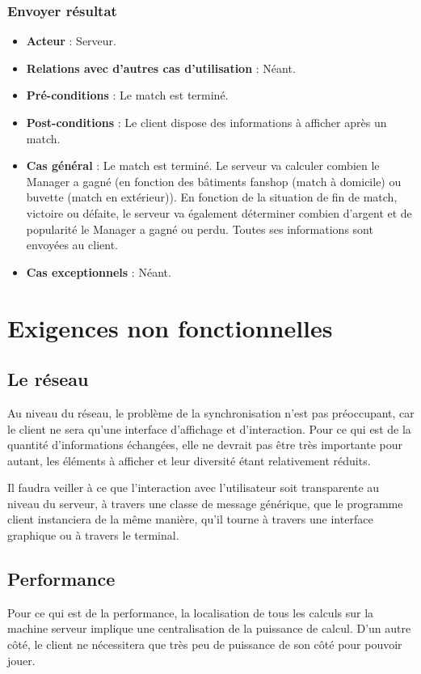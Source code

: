 \documentclass[a4paper,titlepage]{scrreprt}
\begin{document}
    \subsubsection{Envoyer résultat}
      \begin{itemize}
        \item \textbf{Acteur}  : Serveur.
        \item \textbf{Relations avec d'autres cas d'utilisation}  : Néant.
        \item \textbf{Pré-conditions} : Le match est terminé.
        \item \textbf{Post-conditions} : Le client dispose des informations à afficher après un match.
        \item \textbf{Cas général} : Le match est terminé. Le serveur va calculer combien le Manager a gagné (en fonction des bâtiments \gls{fanshop} (match à domicile) ou \gls{buvette} (match en extérieur)). En fonction de la situation de fin de match, victoire ou défaite, le serveur va également déterminer combien d’argent et de popularité le Manager a gagné ou perdu. Toutes ses informations sont envoyées au client.
        \item \textbf{Cas exceptionnels} : Néant.
      \end{itemize}




\section{Exigences non fonctionnelles}
  \subsection{Le réseau}
  Au niveau du réseau, le problème de la synchronisation n'est pas préoccupant, 
  car le client ne sera qu'une interface d'affichage et d'interaction. 
  Pour ce qui est de la quantité d'informations échangées, 
  elle ne devrait pas être très importante pour autant, 
  les éléments à afficher et leur diversité étant relativement réduits.
  
  Il faudra veiller à ce que l'interaction avec l'utilisateur soit transparente 
  au niveau du serveur, à travers une classe de message générique, 
  que le programme client instanciera de la même manière, 
  qu'il tourne à travers une interface graphique ou à travers le terminal.
  \subsection{Performance}
  Pour ce qui est de la performance, la localisation de tous les calculs sur la machine serveur 
  implique une centralisation de la puissance de calcul. 
  D'un autre côté, le client ne nécessitera que très peu de puissance de son côté pour pouvoir jouer.
\end{document}
